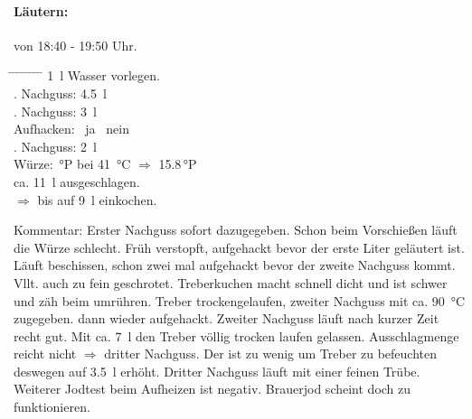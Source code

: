 \documentclass[12pt,oneside,a4paper]{scrartcl}
\begin{document}
\paragraph{Läutern:} von 18:40 - 19:50 Uhr.
	\begin{tabbing}
		\hspace{1cm} \= \hspace{1cm} \= \hspace{1cm} \= \hspace{1cm} \= \hspace{1cm} \=\hspace{1cm} \=\hspace{1cm} \=\hspace{1cm} \= \kill
		\> \SI{1}{\litre} Wasser vorlegen.\\
		\> . Nachguss: \> \> \> \SI{4,5}{\litre}\\
		\> . Nachguss: \> \> \> \SI{3}{\litre}\\
		\> \> \> Aufhacken: \> \> \CheckedBox \ ja \> \> \Square \ nein\\
		\> . Nachguss: \> \> \> \SI{2}{\litre}\\
		\> Würze: \> \> \,°P\> bei \> \SI{41}{\celsius} \> $\Rightarrow$ \> \num{15,8}\,°P\\
		\> \> \> ca. \SI{11}{\litre} ausgeschlagen.\\
		\> \> \> $\Rightarrow$ bis auf \SI{9}{\litre} einkochen.
	\end{tabbing}
	\begin{adjustwidth}{2cm}{0cm}
		\hspace{-1cm}Kommentar: Erster Nachguss sofort dazugegeben. Schon beim Vorschießen läuft die Würze schlecht. Früh verstopft, aufgehackt bevor der erste Liter geläutert ist. Läuft beschissen, schon zwei mal aufgehackt bevor der zweite Nachguss kommt. Vllt. auch zu fein geschrotet. Treberkuchen macht schnell dicht und ist schwer und zäh beim umrühren. Treber trockengelaufen, zweiter Nachguss mit ca. \SI{90}{\celsius} zugegeben. dann wieder aufgehackt. Zweiter Nachguss läuft nach kurzer Zeit recht gut. Mit ca. \SI{7}{\litre} den Treber völlig trocken laufen gelassen. Ausschlagmenge reicht nicht $\Rightarrow$ dritter Nachguss. Der ist zu wenig um Treber zu befeuchten deswegen auf \SI{3,5}{\litre} erhöht. Dritter Nachguss läuft mit einer feinen Trübe. Weiterer Jodtest beim Aufheizen ist negativ. Brauerjod scheint doch zu funktionieren.
	\end{adjustwidth}

\pagebreak[3]
\end{document}
